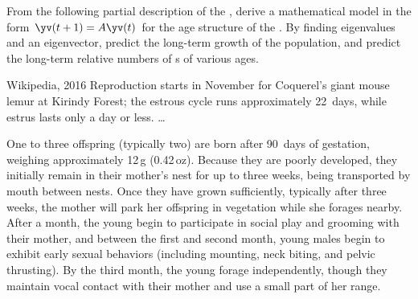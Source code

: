 \begin{exercise} \label{ex:} 
From the following partial description of the , 
derive a mathematical model in the form \(\yv(t+1)=A\yv(t)\) for the age structure of the .
By finding eigenvalues and an eigenvector, predict the long-term growth of the population, and predict the long-term relative numbers of s of various ages.
\begin{quoted}{Wikipedia, 2016}
Reproduction starts in November for Coquerel's giant mouse lemur at Kirindy Forest; the estrous cycle runs approximately 22~days, while estrus lasts only a day or less. \ldots

One to three offspring (typically two) are born after 90~days of gestation, weighing approximately 12\,g (0.42\,oz). Because they are poorly developed, they initially remain in their mother's nest for up to three weeks, being transported by mouth between nests. Once they have grown sufficiently, typically after three weeks, the mother will park her offspring in vegetation while she forages nearby. After a month, the young begin to participate in social play and grooming with their mother, and between the first and second month, young males begin to exhibit early sexual behaviors (including mounting, neck biting, and pelvic thrusting). By the third month, the young forage independently, though they maintain vocal contact with their mother and use a small part of her range.


\end{quoted}
\end{exercise}
